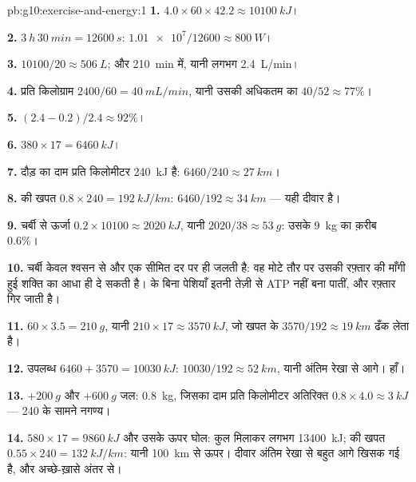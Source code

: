 \begin{solution}{pb:g10:exercise-and-energy:1}
\textbf{1.} $4.0 \times 60 \times 42.2 \approx \qty{10100}{kJ}$।

\textbf{2.} $\qty{3}{h}\,\qty{30}{min} = \qty{12600}{s}$:
$\num{1.01e7}/12600 \approx \qty{800}{W}$।

\textbf{3.} $10100/20 \approx \qty{506}{L}$; और \qty{210}{min} में, यानी
लगभग \qty{2.4}{L/min}।

\textbf{4.} प्रति किलोग्राम $2400/60 = \qty{40}{mL/min}$, यानी उसकी
अधिकतम का $40/52
\approx 77\%$।

\textbf{5.} $(2.4 - 0.2)/2.4 \approx 92\%$।

\textbf{6.} $380 \times 17 = \qty{6460}{kJ}$।

\textbf{7.} दौड़ का दाम प्रति किलोमीटर \qty{240}{kJ} है: $6460/240
\approx \qty{27}{km}$।

\textbf{8.}  की खपत $0.8 \times 240 = \qty{192}{kJ/km}$:
$6460/192 \approx \qty{34}{km}$ --- यही दीवार है।

\textbf{9.} चर्बी से ऊर्जा $0.2 \times 10100 \approx \qty{2020}{kJ}$,
यानी $2020/38 \approx \qty{53}{g}$: उसके \qty{9}{kg} का क़रीब 0.6\%।

\textbf{10.} चर्बी केवल श्वसन से और एक सीमित दर पर ही जलती है: वह मोटे
तौर पर उसकी रफ़्तार की माँगी हुई शक्ति का आधा ही दे सकती है। 
के बिना पेशियाँ इतनी तेज़ी से ATP नहीं बना पातीं, और रफ़्तार गिर जाती है।

\textbf{11.} $60 \times 3.5 = \qty{210}{g}$, यानी $210 \times 17 \approx
\qty{3570}{kJ}$, जो  खपत के $3570/192 \approx \qty{19}{km}$
ढँक लेता है।

\textbf{12.} उपलब्ध  $6460 + 3570 = \qty{10030}{kJ}$:
$10030/192 \approx \qty{52}{km}$, यानी अंतिम रेखा से आगे। हाँ।

\textbf{13.} $+\qty{200}{g}$  और $+ \qty{600}{g}$ जल:
\qty{0.8}{kg}, जिसका दाम प्रति किलोमीटर अतिरिक्त
$0.8 \times 4.0 \approx \qty{3}{kJ}$ --- 240 के सामने नगण्य।

\textbf{14.}  $580 \times 17 = \qty{9860}{kJ}$ और उसके ऊपर
घोल: कुल मिलाकर लगभग \qty{13400}{kJ};  की खपत
$0.55 \times 240 =
\qty{132}{kJ/km}$: यानी \qty{100}{km} से ऊपर। दीवार अंतिम रेखा से बहुत
आगे खिसक गई है, और अच्छे-ख़ासे अंतर से।


\end{solution}
